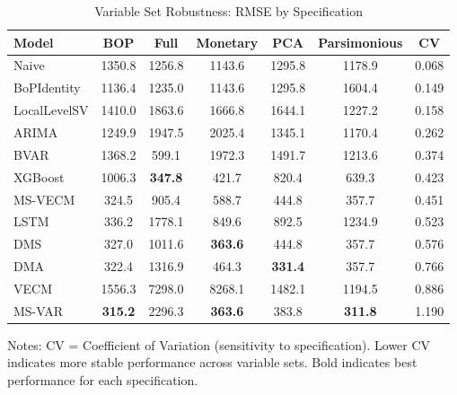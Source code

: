 \begin{table}[htbp]
\centering
\small
\caption{Variable Set Robustness: RMSE by Specification}
\label{tab:varset}
\begin{tabular}{lcccccc}
\toprule
Model & BOP & Full & Monetary & PCA & Parsimonious & CV \\
\midrule
Naive & 1350.8 & 1256.8 & 1143.6 & 1295.8 & 1178.9 & 0.068 \\
BoPIdentity & 1136.4 & 1235.0 & 1143.6 & 1295.8 & 1604.4 & 0.149 \\
LocalLevelSV & 1410.0 & 1863.6 & 1666.8 & 1644.1 & 1227.2 & 0.158 \\
ARIMA & 1249.9 & 1947.5 & 2025.4 & 1345.1 & 1170.4 & 0.262 \\
BVAR & 1368.2 & 599.1 & 1972.3 & 1491.7 & 1213.6 & 0.374 \\
XGBoost & 1006.3 & \textbf{347.8} & 421.7 & 820.4 & 639.3 & 0.423 \\
MS-VECM & 324.5 & 905.4 & 588.7 & 444.8 & 357.7 & 0.451 \\
LSTM & 336.2 & 1778.1 & 849.6 & 892.5 & 1234.9 & 0.523 \\
DMS & 327.0 & 1011.6 & \textbf{363.6} & 444.8 & 357.7 & 0.576 \\
DMA & 322.4 & 1316.9 & 464.3 & \textbf{331.4} & 357.7 & 0.766 \\
VECM & 1556.3 & 7298.0 & 8268.1 & 1482.1 & 1194.5 & 0.886 \\
MS-VAR & \textbf{315.2} & 2296.3 & \textbf{363.6} & 383.8 & \textbf{311.8} & 1.190 \\
\bottomrule
\end{tabular}
\begin{tablenotes}
\small
\item Notes: CV = Coefficient of Variation (sensitivity to specification). 
Lower CV indicates more stable performance across variable sets. 
Bold indicates best performance for each specification.
\end{tablenotes}
\end{table}